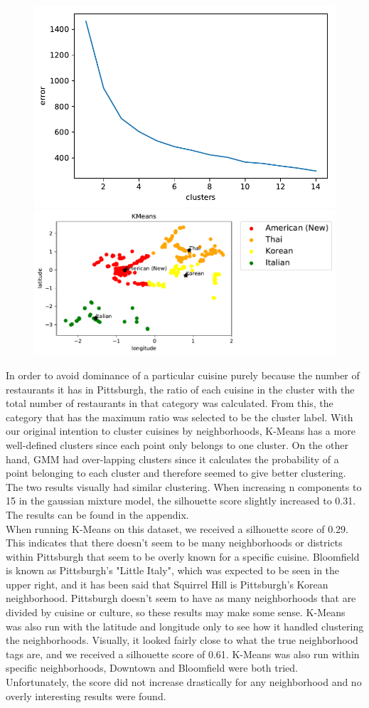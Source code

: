 \documentclass{neu_handout}
\begin{document}
\begin{figure}[h]
\centering
{
\includegraphics[width=0.35\linewidth]{kmeans_error}
}
{
\includegraphics[width=0.5\linewidth]{kmeans_cuisines}
}
\end{figure}


In order to avoid dominance of a particular cuisine purely because the number of restaurants it has in Pittsburgh, the ratio of each cuisine in the cluster with the total number of restaurants in that category was calculated. From this, the category that has the maximum ratio was selected to be the cluster label. With our original intention to cluster cuisines by neighborhoods, K-Means has a more well-defined clusters since each point only belongs to one cluster. On the other hand, GMM had over-lapping clusters since it calculates the probability of a point belonging to each cluster and therefore seemed to give better clustering. The two results visually had similar clustering. When increasing n components to 15 in the gaussian mixture model, the silhouette score slightly increased to 0.31. The results can be found in the appendix.\\

When running K-Means on this dataset, we received a silhouette score of 0.29. This indicates that there doesn't seem to be many neighborhoods or districts within Pittsburgh that seem to be overly known for a specific cuisine. Bloomfield is known as Pittsburgh's "Little Italy", which was expected to be seen in the upper right, and it has been said that Squirrel Hill is Pittsburgh's Korean neighborhood. Pittsburgh doesn't seem to have as many neighborhoods that are divided by cuisine or culture, so these results may make some sense. K-Means was also run with the latitude and longitude only to see how it handled clustering the neighborhoods. Visually, it looked fairly close to what the true neighborhood tags are, and we received a silhouette score of 0.61. K-Means was also run within specific neighborhoods, Downtown and Bloomfield were both tried. Unfortunately, the score did not increase drastically for any neighborhood and no overly interesting results were found.
\end{document}
